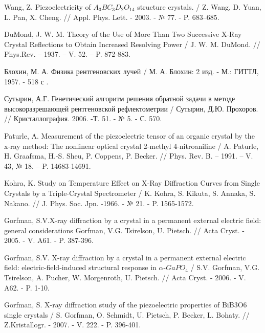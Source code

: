 \begin{thebibliography}{99}
Wang, Z. Piezoelectricity of $A_3BC_3D_2O_{14}$ structure crystals. /
Z. Wang, D. Yuan, L. Pan, X. Cheng. // Appl. Phys. Lett. - 2003. - № 77. -  P. 683–685.

DuMond, J. W. M. Theory of the Use of More Than Two Successive
X-Ray Crystal Reflections to Obtain Increased Resolving Power /
J. W. M. DuMond. // Phys.Rev. – 1937. – V. 52. – P. 872-883.

Блохин, М. А. Физика рентгеновских лучей / М. А. Блохин: 2 изд. - М.: ГИТТЛ, 1957. - 518 с .

Сутырин, А.Г. Генетический алгоритм решения обратной
задачи в методе высокоразрешающей рентгеновской рефлектометрии /
Сутырин, Д.Ю. Прохоров. // Кристаллография. 2006. -Т. 51. - № 5. - С. 570.

Paturle, A. Measurement of the piezoelectric tensor of an organic crystal by the x-ray method:
The nonlinear optical crystal 2-methyl 4-nitroaniline / A. Paturle, H. Graafsma,
H.-S. Sheu, P. Coppens, P. Becker. // Phys. Rev. B. – 1991. – V. 43, № 18. – P. 14683-14691.

Kohra, K. Study on Temperature Effect on X-Ray
Diffraction Curves from Single Crystals by a Triple-Crystal Spectrometer /
K. Kohra, S. Kikuta, S. Annaka, S. Nakano. // J. Phys. Soc. Jpn. -1966. - № 21. - P. 1565-1572.

Gorfman, S.V.X-ray diffraction by a crystal in a permanent external electric field: general considerations
 Gorfman, V.G. Tsirelson, U. Pietsch. // Acta Cryst. - 2005. - V. A61. -  P. 387-396.

Gorfman, S.V.
X-ray diffraction by a crystal in a permanent external electric
field: electric-field-induced structural response in $\alpha$-$GaPO_4$ /
S.V. Gorfman, V.G. Tsirelson, A. Pucher, W. Morgenroth, U. Pietsch. // Acta Cryst. - 2006. - V. A62. - P. 1-10.

Gorfman, S. X-ray diffraction study of the piezoelectric properties of BiB3O6 single crystals /
S. Gorfman, O. Schmidt, U. Pietsch, P. Becker, L. Bohaty. // Z.Kristallogr. - 2007. - V. 222. - P. 396-401.


\end{thebibliography}
